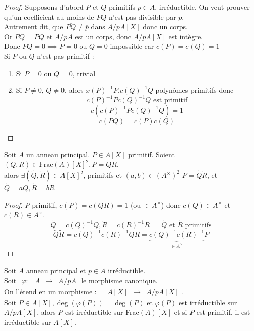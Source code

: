 \documentclass[]{report}
\begin{document}
    \begin{proof}
        Supposons d'abord $P$ et $Q$ primitifs $p\in A$, irréductible. On veut prouver qu'un coefficient au moins de $PQ$ n'est pas divisible par $p$.\\
        Autrement dit, que $\overline{PQ}\neq\overline{p}$ dans $A/pA[X]$ donc un corps.\\
        Or $\overline{PQ}=\overline{P}\overline{Q}$ et $A/pA$ est un corps, donc $A/pA[X]$ est intègre.\\
        Donc $\overline{PQ}=\overline{0}\implies \overline{P}=\overline{0}$ ou $\overline{Q}=\overline{0}$ impossible car $c(P)=c(Q)=1$\\
        Si $P$ ou $Q$ n'est pas primitif :
        \begin{enumerate}
            \item Si $P=0$ ou $Q=0$, trivial
            \item Si $P\neq0$, $Q\neq0$, alors $x(P)^{-1}P$,$ c(Q)^{-1}Q$ polynômes primitifs donc
            \[c(P)^{-1}Pc(Q)^{-1}Q\text{ est primitif}\]
            \[c(c(P)^{-1}Pc(Q)^{-1}Q)=1\]
            \[c(PQ)=c(P)c(Q)\]
        \end{enumerate}
    \end{proof}

    \begin{lm}{}{}
        Soit $A$ un anneau principal. $P\in A[X]$ primitif. Soient $(Q,R)\in\text{Frac}(A)[X]^2,P=QR$, \\
        alors $\exists(\tilde{Q},\tilde{R})\in A[X]^2$, primitifs et $(a,b)\in(A^\times)^2$ \tq $P=\tilde{Q}\tilde{R}$, et $\tilde{Q}=aQ,\tilde{R}=bR$
    \end{lm}

    \begin{proof}
        $P$ primitif, $c(P)=c(QR)=1$ (ou $\in A^\times$) donc $c(Q)\in A^\times$ et $c(R)\in A^\times$.\\
        \[\widetilde{Q}=c(Q)^{-1}Q,\widetilde{R}=c(R)^{-1}R\quad \text{ $\widetilde{Q}$ et $\widetilde{R}$ primitifs}\]
        \[\widetilde{Q}\widetilde{R}=c(Q)^{-1}c(R)^{-1}QR=\underset{\in A^\times}{\underbrace{c(Q)^{-1}c(R)^{-1}}}P\]
    \end{proof}

    \begin{tm}{}{}
        Soit $A$ anneau principal et $p\in A$ irréductible. \\
        Soit $\begin{array}{ccccc}
    \varphi : & A & \to & A/pA
    \end{array}$ le morphisme canonique.\\
    On l'étend en un morphisme : $\begin{array}{ccccc}
    & A[X] & \to & A/pA[X]
    \end{array}$. \\
    Soit $P\in A[X], \deg(\varphi(P))=\deg(P)$ et $\varphi(P)$ est irréductible sur $A/pA[X]$, alors $P$ est irréductible sur Frac$(A)[X]$ et si $P$ est primitif, il est irréductible sur $A[X]$.
    \end{tm}
\end{document}

